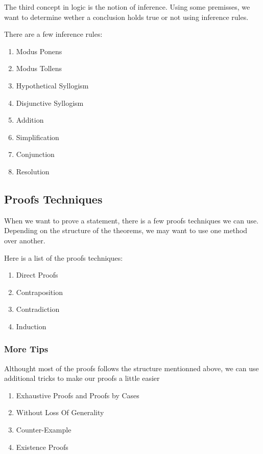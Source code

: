 \documentclass{article}
\begin{document}
The third concept in logic is the notion of inference. Using some premisses,
we want to determine wether a conclusion holds true or not using inference rules.

There are a few inference rules:

    \begin{enumerate}
	\item Modus Ponens
	\item Modus Tollens
	\item Hypothetical Syllogism
	\item Disjunctive Syllogism
	\item Addition
	\item Simplification
	\item Conjunction
	\item Resolution
    \end{enumerate}


\subsection{Proofs Techniques}

When we want to prove a statement, there is a few proofs techniques we can use.
Depending on the structure of the theorems, we may want to use one method over
another.

Here is a list of the proofs techniques:

    \begin{enumerate}
	\item Direct Proofs
	\item Contraposition
	\item Contradiction
	\item Induction
    \end{enumerate}

\subsubsection{More Tips}

Althought most of the proofs follows the structure mentionned above, we can use
additional tricks to make our proofs a little easier

    \begin{enumerate}
	\item Exhaustive Proofs and Proofs by Cases
	\item Without Loss Of Generality
	\item Counter-Example
	\item Existence Proofs
    \end{enumerate}
\end{document}
